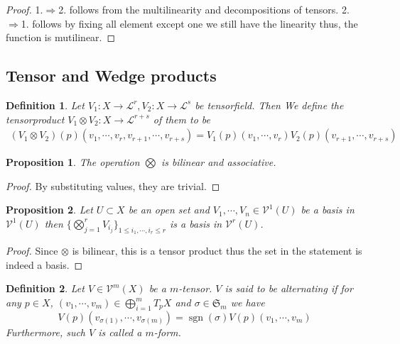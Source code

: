\documentclass{article}
\newtheorem{proposition}{Proposition}[section]
\newtheorem{definition}{Definition}[section]
\numberwithin{equation}{section}
\DeclareMathOperator{\sgn}{sgn}
\begin{document}
\begin{proof}
1.$\Rightarrow$2. follows from the multilinearity and decompositions of tensors. 2.$\Rightarrow$1. follows by fixing all element except one we still have the linearity thus, the function is mutilinear. 
\end{proof}


\subsection{Tensor and Wedge products}

\begin{definition}
Let $V_1:X\to\mathcal{L}^r,V_2:X\to\mathcal{L}^s$ be tensorfield. Then We define the tensorproduct $V_1\otimes V_2:X\to\mathcal{L}^{r+s}$ of them to be
\begin{align*}
 (V_1\otimes V_2)(p)(v_1,\cdots, v_r,v_{r+1},\cdots,v_{r+s}) = V_1(p)(v_1,\cdots,v_r)V_2(p)(v_{r+1},\cdots,v_{r+s})
\end{align*}
\end{definition}

\begin{proposition}
The operation $\bigotimes$ is bilinear and associative.
\end{proposition}

\begin{proof}
By substituting values, they are trivial.
\end{proof}

\begin{proposition}
Let $U\subset X$ be an open set and $V_1,\cdots,V_n\in\mathcal{V}^1(U)$ be a basis in $\mathcal{V}^1(U)$ then $\{\bigotimes_{j=1}^rV_{i_j}\}_{1\leq i_1,\cdots,i_r\leq r}$ is a basis in $\mathcal{V}^r(U)$.
\end{proposition}

\begin{proof}
Since $\otimes$ is bilinear, this is a tensor product thus the set in the statement is indeed a basis.
\end{proof}

\begin{definition}
Let $V\in\mathcal{V}^m(X)$ be a $m$-tensor. $V$ is said to be alternating if for any $p\in X$, $(v_1,\cdots,v_m)\in\bigoplus_{i=1}^m T_pX$ and $\sigma\in\mathfrak{S}_m$ we have
\begin{equation*}
V(p)(v_{\sigma(1)},\cdots,v_{\sigma(m)})=\sgn(\sigma)V(p)(v_1,\cdots,v_m)
\end{equation*}
Furthermore, such $V$ is called a $m$-form.
\end{definition}
\end{document}
